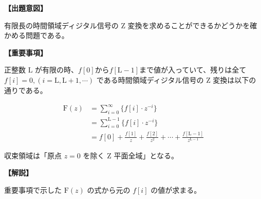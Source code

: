 \noindent \textbf{【出題意図】}

\bigskip
\noindent 有限長の時間領域ディジタル信号の Z 変換を求めることができるかどうかを確かめる問題である。

\vspace{1em}
\noindent \textbf{【重要事項】}

\medskip
正整数 $\textrm{L}$ が有限の時、$f[0]$から$f[\textrm{L}-1]$まで値が入っていて、残りは全て $f[i]=0, (i=\textrm{L},\textrm{L}+1,\cdots)$ である時間領域ディジタル信号の Z 変換は以下の通りである。

\begin{align*}
\textrm{F}(z) 
& = \sum_{i=0}^\infty \{ f[i] \cdot z^{-i} \} \\
& = \sum_{i=0}^{\textrm{L}-1} \{ f[i] \cdot z^{-i} \} \\
& = f[0] + \frac{f[1]}{z} + \frac{f[2]}{z^2} + \cdots + \frac{f[\textrm{L}-1]}{z^{\textrm{L}-1}}
\end{align*}

\medskip
\noindent 収束領域は「原点 $z=0$ を除く Z 平面全域」となる。

\bigskip

\vspace{1em}
\noindent \textbf{【解説】}

\bigskip
\noindent 重要事項で示した $\textrm{F}(z)$ の式から元の $f[i]$ の値が求まる。
